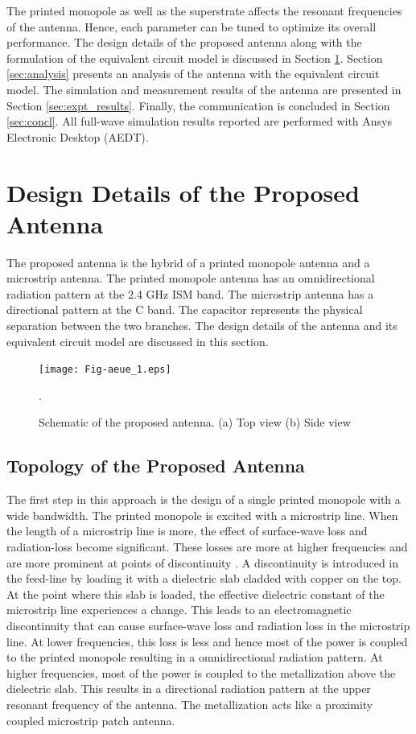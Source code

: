 The printed monopole as well as the superstrate affects the resonant frequencies of the antenna. Hence, each parameter can be tuned to optimize its overall performance. The design details of the proposed antenna along with the formulation of the equivalent circuit model is discussed in Section \ref{sec:design}. Section \ref{sec:analysis} presents an analysis of the antenna with the equivalent circuit model. The simulation and measurement results of the antenna are presented in Section \ref{sec:expt_results}. Finally, the communication is concluded in Section \ref{sec:concl}. All full-wave simulation results reported are performed with Ansys Electronic Desktop (AEDT).
\section{Design Details of the Proposed Antenna}\label{sec:design}
The proposed antenna is the hybrid of a printed monopole antenna and a microstrip antenna. The printed monopole antenna has an omnidirectional radiation pattern at the 2.4 GHz ISM band. The microstrip antenna has a directional pattern at the C band. The capacitor represents the physical separation between the two branches. The design details of the antenna and its equivalent circuit model are discussed in this section.

\begin{figure}[t]
\centering
\texttt{[image: Fig-aeue\_1.eps]}
\caption{Schematic of the proposed antenna. (a) Top view (b) Side view}\label{topology}.
\end{figure}

\subsection{Topology of the Proposed Antenna}
The first step in this approach is the design of a single printed monopole with a wide bandwidth. The printed monopole is excited with a microstrip line. When the length of a microstrip line is more, the effect of surface-wave loss and radiation-loss become significant. These losses are more at higher frequencies and are more prominent at points of discontinuity \cite{rad_loss}. A discontinuity is introduced in the feed-line by loading it with a dielectric slab cladded with copper on the top. At the point where this slab is loaded, the effective dielectric constant of the microstrip line experiences a change. This leads to an electromagnetic discontinuity that can cause surface-wave loss and radiation loss in the microstrip line. At lower frequencies, this loss is less and hence most of the power is coupled to the printed monopole resulting in a omnidirectional radiation pattern. At higher frequencies, most of the power is coupled to the metallization above the dielectric slab. This results in a directional radiation pattern at the upper resonant frequency of the antenna. The metallization acts like a proximity coupled microstrip patch antenna.


